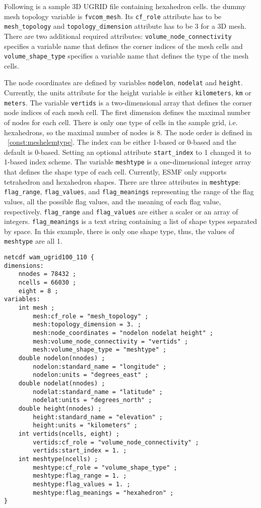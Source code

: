 Following is a sample 3D UGRID file containing hexahedron cells. the dummy mesh topology variable is {\tt fvcom\_mesh}. Its {\tt cf\_role} attribute has to be {\tt mesh\_topology}
and {\tt topology\_dimension} attribute has to be 3 for a 3D mesh.  There are two additional required attributes:
{\tt volume\_node\_connectivity} specifies a variable name that defines the corner indices of the mesh cells and
{\tt volume\_shape\_type} specifies a variable name that defines the type of the mesh cells.

The node coordinates are defined by variables {\tt nodelon}, {\tt nodelat} and {\tt height}. Currently, the units
attribute for the height variable is either {\tt kilometers}, {\tt km} or {\tt meters}.
The variable {\tt vertids} is a two-dimensional array that defines the corner node indices of each mesh cell. The first dimension
defines the maximal number of nodes for each cell. There is only one type of cells in the sample grid, i.e. hexahedrons, so the maximal number
of nodes is 8.  The node order is defined in ~\ref{const:meshelemtype}.  The index can be either 1-based or 0-based and
the default is 0-based.
 Setting an optional attribute {\tt start\_index} to 1 changed it to 1-based index scheme.
The variable {\tt meshtype} is a one-dimensional integer array that defines the shape type of each cell.  Currently, ESMF only
supports tetrahedron and hexahedron shapes. There are three attributes in {\tt meshtype}: {\tt flag\_range}, {\tt flag\_values}, and {\tt flag\_meanings} representing the range of the flag values, all the possible flag values, and the meaning of each flag value, respectively.  {\tt flag\_range} and {\tt flag\_values} are either a scaler or an array of integers.  {\tt flag\_meanings} is a text string containing a list of shape types separated by space. In this example, there
is only one shape type, thus, the values of {\tt meshtype} are all 1.

\begin{verbatim}
netcdf wam_ugrid100_110 {
dimensions:
	nnodes = 78432 ;
	ncells = 66030 ;
	eight = 8 ;
variables:
	int mesh ;
		mesh:cf_role = "mesh_topology" ;
		mesh:topology_dimension = 3. ;
		mesh:node_coordinates = "nodelon nodelat height" ;
		mesh:volume_node_connectivity = "vertids" ;
		mesh:volume_shape_type = "meshtype" ;
	double nodelon(nnodes) ;
		nodelon:standard_name = "longitude" ;
		nodelon:units = "degrees_east" ;
	double nodelat(nnodes) ;
		nodelat:standard_name = "latitude" ;
		nodelat:units = "degrees_north" ;
	double height(nnodes) ;
		height:standard_name = "elevation" ;
		height:units = "kilometers" ;
	int vertids(ncells, eight) ;
		vertids:cf_role = "volume_node_connectivity" ;
		vertids:start_index = 1. ;
	int meshtype(ncells) ;
		meshtype:cf_role = "volume_shape_type" ;
		meshtype:flag_range = 1. ;
		meshtype:flag_values = 1. ;
		meshtype:flag_meanings = "hexahedron" ;
}
\end{verbatim}

